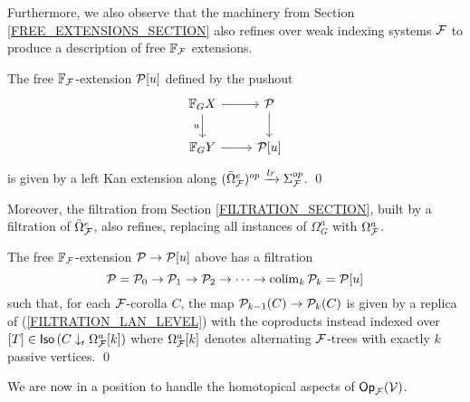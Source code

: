 \documentclass[a4paper,10pt]{article}%
\begin{document}
Furthermore, we also observe that the machinery from Section \ref{FREE_EXTENSIONS_SECTION} also refines over weak indexing systems $\F$ to produce a description of free $\mathbb F_\F$ extensions.
\begin{corollary}
        The free $\mathbb F_\F$-extension $\P[u]$ defined by the pushout
        \[
        \begin{tikzcd}
                \mathbb F_G X \arrow[d, "u"'] \arrow[r] & \P \arrow[d]\\
                \mathbb F_G Y \arrow[r] & \P[u]
        \end{tikzcd}
        \]
        is given by a left Kan extension along $(\bar\Omega_\F^e)^{op} \xrightarrow{lr} \Sigma_\F^{op}$. \qed
\end{corollary}

Moreover, the filtration from Section \ref{FILTRATION_SECTION}, built by a filtration of $\bar\Omega_\F^e$, also refines, replacing all instances of $\Omega_G^a$ with $\Omega_\F^a$. 

\begin{proposition}
        \label{F_FILTRATION_LAN_LEVEL}
        The free $\mathbb F_\F$-extension $\P \to \P[u]$ above has a filtration
        \[
        \P = \P_0 \to \P_1 \to \P_2 \to \cdots \to \colim_k \P_k = \P[u]
        \]
        such that, for each $\F$-corolla $C$,
        the map $\P_{k-1}(C) \to \P_{k}(C)$ is given by a replica of (\ref{FILTRATION_LAN_LEVEL}) with the coproducts instead indexed over 
        $[T] \in \mathsf{Iso}
        \left( C \downarrow_{\mathsf r} \Omega_\F^a[k] \right)$
        where $\Omega_\F^a[k]$ denotes alternating $\F$-trees with exactly $k$ passive vertices. \qed
\end{proposition}

We are now in a position to handle the homotopical aspects of $\Op_\F(\V)$. 
\end{document}
